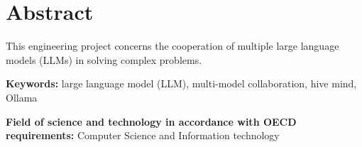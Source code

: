 \chapter*{Abstract}

This engineering project concerns the cooperation of multiple large language models (LLMs) in solving complex problems.

\vspace{\baselineskip}

\noindent
\textbf{Keywords:} large language model (LLM), multi-model collaboration, hive mind, Ollama

\noindent
\textbf{Field of science and technology in accordance with OECD requirements:} Computer Science and Information technology